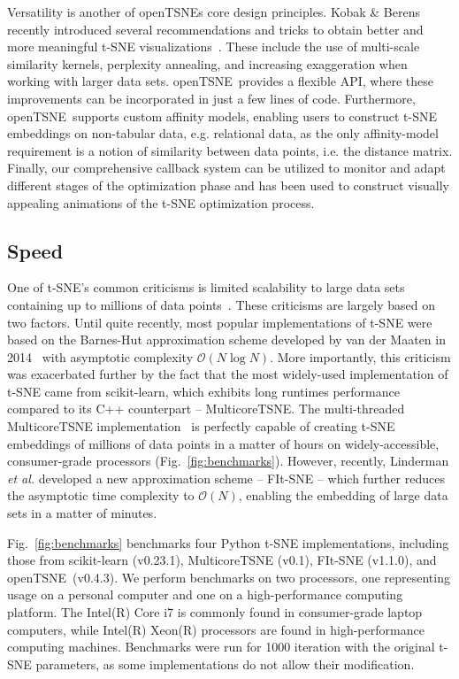 \documentclass[twocolumn]{bmcart}
\newcommand{\opentsne}{\textsf{openTSNE}}
\begin{document}
Versatility is another of  \opentsne s core design principles. Kobak \& Berens
recently introduced several recommendations and tricks to obtain better and
more meaningful t-SNE visualizations~\cite{kobak2019art}. These include the use
of multi-scale similarity kernels, perplexity annealing, and increasing
exaggeration when working with larger data sets. \opentsne\ provides a flexible
API, where these improvements can be incorporated in just a few lines of code.
Furthermore, \opentsne\ supports custom affinity models, enabling users to
construct t-SNE embeddings on non-tabular data, e.g. relational data, as the
only affinity-model requirement is a notion of similarity between data points,
i.e. the distance matrix.  Finally, our comprehensive callback system can be
utilized to monitor and adapt different stages of the optimization phase and
has been used to construct visually appealing animations of the t-SNE
optimization process.


\subsection*{Speed}

One of t-SNE's common criticisms is limited scalability to large data sets
containing up to millions of data points~\cite{becht2019dimensionality}. These
criticisms are largely based on two factors. Until quite recently, most popular
implementations of t-SNE were based on the Barnes-Hut approximation scheme
developed by van der Maaten in 2014~\cite{van2014accelerating} with asymptotic
complexity $\mathcal{O}(N \log N)$. More importantly, this criticism was
exacerbated further by the fact that the most widely-used implementation of
t-SNE came from \textsf{scikit-learn}, which exhibits long runtimes
performance compared to its C++ counterpart -- \textsf{MulticoreTSNE}. The
multi-threaded \textsf{MulticoreTSNE} implementation~\cite{Ulyanov2016} is
perfectly capable of creating t-SNE embeddings of millions of data points in a
matter of hours on widely-accessible, consumer-grade processors
(Fig.~\ref{fig:benchmarks}). However, recently, Linderman \textit{et al.}
developed a new approximation scheme -- FIt-SNE -- which further reduces the
asymptotic time complexity to $\mathcal{O}(N)$, enabling the embedding of large
data sets in a matter of minutes.

Fig.~\ref{fig:benchmarks} benchmarks four Python t-SNE implementations,
including those from \textsf{scikit-learn} (v0.23.1), \textsf{MulticoreTSNE}
(v0.1), \textsf{FIt-SNE} (v1.1.0), and \opentsne\ (v0.4.3). We perform
benchmarks on two processors, one representing usage on a personal computer and
one on a high-performance computing platform. The Intel(R) Core i7 is commonly
found in consumer-grade laptop computers, while Intel(R) Xeon(R) processors are
found in high-performance computing machines. Benchmarks were run for 1000 iteration with the original t-SNE parameters, as some implementations do not
allow their modification. 
\end{document}
